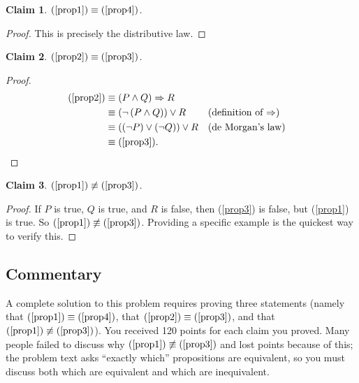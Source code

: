 \documentclass[12pt]{midterm}
\newtheorem*{claim}{Claim}
\begin{document}
\begin{exam}
\begin{solution}
\begin{solutiontext}
\begin{claim}
  $\mbox{(\ref{prop1})} \equiv \mbox{(\ref{prop4})}$.
\end{claim}
\begin{proof}
This is precisely the distributive law.
\end{proof}

\begin{claim}
  $\mbox{(\ref{prop2})} \equiv \mbox{(\ref{prop3})}$.
\end{claim}
\begin{proof}
  \begin{align*}
    \mbox{(\ref{prop2})}
    &\equiv (P \wedge Q) \Rightarrow R \\
    &\equiv \left( \neg \left(P \wedge Q\right) \right) \vee R && \text{(definition of $\Rightarrow$)} \\
    &\equiv \left( \left( \neg P \right) \vee \left( \neg Q\right) \right) \vee R && \text{(de Morgan's law)} \\
    &\equiv \mbox{(\ref{prop3})}. \\
  \end{align*}
\end{proof}

\begin{claim}
  $\mbox{(\ref{prop1})} \not\equiv \mbox{(\ref{prop3})}$.
\end{claim}
\begin{proof}
  If $P$ is true, $Q$ is true, and $R$ is false, then (\ref{prop3}) is
  false, but (\ref{prop1}) is true.  So $\mbox{(\ref{prop1})}
  \not\equiv \mbox{(\ref{prop3})}$.  Providing a specific example is the
  quickest way to verify this.
\end{proof}

\color{magenta!50!black}
\vfill
\setlength{\leftskip}{0in}
\subsection*{Commentary}

A complete solution to this problem requires proving three statements
(namely that $\mbox{(\ref{prop1})} \equiv \mbox{(\ref{prop4})}$, that
$\mbox{(\ref{prop2})} \equiv \mbox{(\ref{prop3})}$, and that
$\mbox{(\ref{prop1})} \not\equiv \mbox{(\ref{prop3})}$).  You received
120 points for each claim you proved.  Many people failed to discuss
why $\mbox{(\ref{prop1})} \not\equiv \mbox{(\ref{prop3})}$ and lost
points because of this; the problem text asks ``exactly which''
propositions are equivalent, so you must discuss both which are
equivalent and which are inequivalent.


\end{solutiontext}
\end{solution}
\end{exam}
\end{document}
